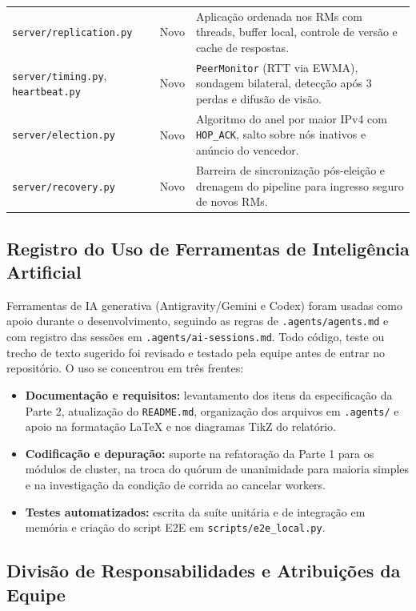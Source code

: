 \documentclass[12pt]{article}
\begin{document}
\begin{table}[H]
\begin{tabularx}{\textwidth}{l l X}
\texttt{server/replication.py} & Novo & Aplicação ordenada nos RMs com threads, buffer local, controle de versão e cache de respostas. \\
\texttt{server/timing.py}, \texttt{heartbeat.py} & Novo & \texttt{PeerMonitor} (RTT via EWMA), sondagem bilateral, detecção após 3 perdas e difusão de visão. \\
\texttt{server/election.py} & Novo & Algoritmo do anel por maior IPv4 com \texttt{HOP\_ACK}, salto sobre nós inativos e anúncio do vencedor. \\
\texttt{server/recovery.py} & Novo & Barreira de sincronização pós-eleição e drenagem do pipeline para ingresso seguro de novos RMs. \\
\bottomrule
\end{tabularx}
\end{table}

\subsection{Registro do Uso de Ferramentas de Inteligência Artificial}

Ferramentas de IA generativa (Antigravity/Gemini e Codex) foram usadas como apoio durante o desenvolvimento, seguindo as regras de \texttt{.agents/agents.md} e com registro das sessões em \texttt{.agents/ai-sessions.md}. Todo código, teste ou trecho de texto sugerido foi revisado e testado pela equipe antes de entrar no repositório. O uso se concentrou em três frentes:

\begin{itemize}
    \item \textbf{Documentação e requisitos:} levantamento dos itens da especificação da Parte 2, atualização do \texttt{README.md}, organização dos arquivos em \texttt{.agents/} e apoio na formatação \LaTeX{} e nos diagramas TikZ do relatório.
    \item \textbf{Codificação e depuração:} suporte na refatoração da Parte 1 para os módulos de cluster, na troca do quórum de unanimidade para maioria simples e na investigação da condição de corrida ao cancelar workers.
    \item \textbf{Testes automatizados:} escrita da suíte unitária e de integração em memória e criação do script E2E em \texttt{scripts/e2e\_local.py}.
\end{itemize}

\subsection{Divisão de Responsabilidades e Atribuições da Equipe}
\end{document}
